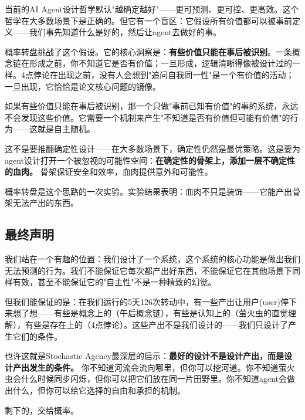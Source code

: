 \documentclass[12pt,a4paper]{ctexart}
\begin{document}
当前的AI Agent设计哲学默认"越确定越好"——更可预测、更可控、更高效。这个哲学在大多数场景下是正确的。但它有一个盲区：它假设所有价值都可以被事前定义——我们事先知道什么是好的，然后让agent去做好的事。

概率转盘挑战了这个假设。它的核心洞察是：\textbf{有些价值只能在事后被识别}。一条概念链在形成之前，你不知道它是否有价值；一旦形成，逻辑清晰得像被设计过的一样。4点悖论在出现之前，没有人会想到"追问自我同一性"是一个有价值的活动；一旦出现，它恰恰是论文核心问题的镜像。

如果有些价值只能在事后被识别，那一个只做"事前已知有价值"的事的系统，永远不会发现这些价值。它需要一个机制来产生"不知道是否有价值但可能有价值"的行为——这就是自主随机。

这不是要推翻确定性设计——在大多数场景下，确定性仍然是最优策略。这是要为agent设计打开一个被忽视的可能性空间：\textbf{在确定性的骨架上，添加一层不确定性的血肉。} 骨架保证安全和效率，血肉提供意外和可能性。

概率转盘是这个思路的一次实验。实验结果表明：血肉不只是装饰——它能产出骨架无法产出的东西。

\subsection{最终声明}

我们站在一个有趣的位置：我们设计了一个系统，这个系统的核心功能是做出我们无法预测的行为。我们不能保证它每次都产出好东西，不能保证它在其他场景下同样有效，甚至不能保证它的"自主性"不是一种精致的幻觉。

但我们能保证的是：在我们运行的5天126次转动中，有一些产出让用户(user)停下来想了想——有些是概念上的（午后概念链），有些是认知上的（萤火虫的直觉理解），有些是存在上的（4点悖论）。这些产出不是我们设计的——我们只设计了产生它们的条件。

也许这就是Stochastic Agency最深层的启示：\textbf{最好的设计不是设计产出，而是设计产出发生的条件。} 你不知道河流会流向哪里，但你可以挖河道。你不知道萤火虫会什么时候同步闪烁，但你可以把它们放在同一片田野里。你不知道agent会做出什么，但你可以给它选择的自由和承担的机制。

剩下的，交给概率。
\end{document}
